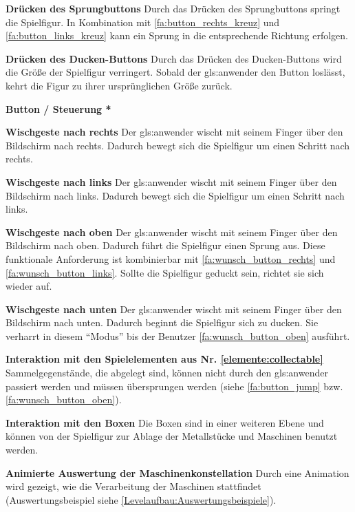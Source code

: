 \documentclass{scrartcl}
\begin{document}
\begin{falist}[resume]
\begin{falist}
    	\item \label{fa:button_jump} \textbf{Drücken des Sprungbuttons} Durch das Drücken des Sprungbuttons springt die Spielfigur. In Kombination mit \ref{fa:button_rechts_kreuz} und \ref{fa:button_links_kreuz} kann ein Sprung in die entsprechende Richtung erfolgen.
    	\item \label{fa:button_ducken} \textbf{Drücken des Ducken-Buttons} Durch das Drücken des Ducken-Buttons wird die Größe der Spielfigur verringert. Sobald der \gls{gls:anwender} den Button loslässt, kehrt die Figur zu ihrer ursprünglichen Größe zurück.
    \end{falist}
    \item \label{fa:button_wunsch} \textbf{Button / Steuerung *}
    \begin{falist}
    	\item \label{fa:wunsch_button_rechts} \textbf{Wischgeste nach rechts} Der \gls{gls:anwender} wischt mit seinem Finger über den Bildschirm nach rechts. Dadurch bewegt sich die Spielfigur um einen Schritt nach rechts.
    	\item \label{fa:wunsch_button_links} \textbf{Wischgeste nach links} Der \gls{gls:anwender} wischt mit seinem Finger über den Bildschirm nach links. Dadurch bewegt sich die Spielfigur um einen Schritt nach links.
    	\item \label{fa:wunsch_button_oben} \textbf{Wischgeste nach oben} Der \gls{gls:anwender} wischt mit seinem Finger über den Bildschirm nach oben. Dadurch führt die Spielfigur einen Sprung aus. Diese funktionale Anforderung ist kombinierbar mit \ref{fa:wunsch_button_rechts} und \ref{fa:wunsch_button_links}. Sollte die Spielfigur geduckt sein, richtet sie sich wieder auf.
    	\item \label{fa:wunsch_button_unten} \textbf{Wischgeste nach unten} Der \gls{gls:anwender} wischt mit seinem Finger über den Bildschirm nach unten. Dadurch beginnt die Spielfigur sich zu ducken. Sie verharrt in diesem \enquote{Modus} bis der Benutzer \ref{fa:wunsch_button_oben} ausführt.
    \end{falist}
	\item \textbf{Interaktion mit den Spielelementen aus Nr. \ref{elemente:collectable}} Sammelgegenstände, die abgelegt sind, können nicht durch den \gls{gls:anwender} passiert werden und müssen übersprungen werden (siehe \ref{fa:button_jump} bzw. \ref{fa:wunsch_button_oben}).
	\item \textbf{Interaktion mit den Boxen} Die Boxen sind in einer weiteren Ebene und können von der Spielfigur zur Ablage der Metallstücke und Maschinen benutzt werden.
	\item \label{fa:auswertung_animiert} \textbf{Animierte Auswertung der Maschinenkonstellation} Durch eine Animation wird gezeigt, wie die Verarbeitung der Maschinen stattfindet (Auswertungsbeispiel siehe \ref{Levelaufbau:Auswertungsbeispiele}).
\end{falist}
\end{document}
